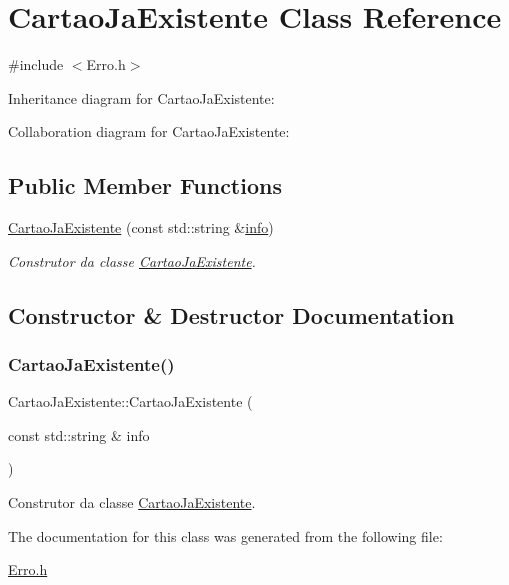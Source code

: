 \hypertarget{class_cartao_ja_existente}{}\section{Cartao\+Ja\+Existente Class Reference}
\label{class_cartao_ja_existente}


{\ttfamily \#include $<$Erro.\+h$>$}



Inheritance diagram for Cartao\+Ja\+Existente\+:


Collaboration diagram for Cartao\+Ja\+Existente\+:
\subsection*{Public Member Functions}
\begin{DoxyCompactItemize}
\item 
\mbox{\hyperlink{class_cartao_ja_existente_ab3efa558a7577d97eff97b81aabc1647}{Cartao\+Ja\+Existente}} (const std\+::string \&\mbox{\hyperlink{class_erro_a3ecaaf6f8e15a0830a648035b456cb62}{info}})
\begin{DoxyCompactList}\small\item\em Construtor da classe \mbox{\hyperlink{class_cartao_ja_existente}{Cartao\+Ja\+Existente}}. \end{DoxyCompactList}\end{DoxyCompactItemize}


\subsection{Constructor \& Destructor Documentation}
\mbox{\label{class_cartao_ja_existente_ab3efa558a7577d97eff97b81aabc1647}} 
\subsubsection{\texorpdfstring{Cartao\+Ja\+Existente()}{CartaoJaExistente()}}
{\footnotesize\ttfamily Cartao\+Ja\+Existente\+::\+Cartao\+Ja\+Existente (\begin{DoxyParamCaption}\item[{const std\+::string \&}]{info }\end{DoxyParamCaption})\hspace{0.3cm}{\ttfamily [inline]}}



Construtor da classe \mbox{\hyperlink{class_cartao_ja_existente}{Cartao\+Ja\+Existente}}. 



The documentation for this class was generated from the following file\+:\begin{DoxyCompactItemize}
\item 
\mbox{\hyperlink{_erro_8h}{Erro.\+h}}\end{DoxyCompactItemize}
